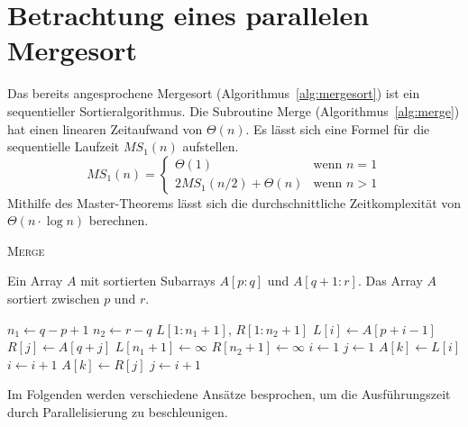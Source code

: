\section{Betrachtung eines parallelen Mergesort}
Das bereits angesprochene Mergesort (Algorithmus~\ref{alg:mergesort}) ist ein
sequentieller Sortieralgorithmus.
Die Subroutine Merge (Algorithmus~\ref{alg:merge}) hat einen linearen
Zeitaufwand von $\Theta(n)$.
Es lässt sich eine Formel für die sequentielle Laufzeit $MS_1(n)$ aufstellen.
\begin{equation}
    MS_1(n) = \begin{cases}
        \Theta(1) & \text{wenn } n = 1 \\
        2MS_1(n/2) + \Theta(n) & \text{wenn } n > 1
    \end{cases}
\end{equation}
Mithilfe des Master-Theorems lässt sich die durchschnittliche Zeitkomplexität
von $\Theta(n \cdot \log n)$ berechnen.
%
\begin{algorithm}
    \caption{{\rmfamily \textsc{Merge}} \cite[S.31]{cormen}}
    \label{alg:merge}
    \begin{algorithmic}[1]
        \Require Ein Array $A$ mit sortierten Subarrays $A[p:q]$ und
            $A[q+1:r]$.
        \Ensure Das Array $A$ sortiert zwischen $p$ und $r$.
        \setlength\multicolsep{0pt}
        \begin{multicols}{2}
            \State $n_1 \gets q - p + 1$
            \State $n_2 \gets r - q$
            \State $L[1:n_1 +1]$, $R[1:n_2 + 1]$
                \State $L[i] \gets A[p + i - 1]$
            \EndFor
                \State $R[j] \gets A[q + j]$
            \EndFor
            \State $L[n_1 + 1] \gets \infty$
            \State $R[n_2 + 1] \gets \infty$
            \State $i \gets 1$
            \State $j \gets 1$
                    \State $A[k] \gets L[i]$
                    \State $i \gets i + 1$
                \Else
                    \State $A[k] \gets R[j]$
                    \State $j \gets i + 1$
                \EndIf
            \EndFor
        \end{multicols}
    \end{algorithmic}
\end{algorithm}

Im Folgenden werden verschiedene Ansätze besprochen, um die Ausführungszeit
durch Parallelisierung zu beschleunigen.

